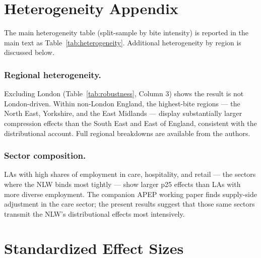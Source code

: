 \documentclass[12pt]{article}
\begin{document}
\section{Heterogeneity Appendix}

The main heterogeneity table (split-sample by bite intensity) is reported in the main text as Table~\ref{tab:heterogeneity}. Additional heterogeneity by region is discussed below.

\subsubsection*{Regional heterogeneity.}
Excluding London (Table~\ref{tab:robustness}, Column 3) shows the result is not London-driven. Within non-London England, the highest-bite regions --- the North East, Yorkshire, and the East Midlands --- display substantially larger compression effects than the South East and East of England, consistent with the distributional account. Full regional breakdowns are available from the authors.

\subsubsection*{Sector composition.}
LAs with high shares of employment in care, hospitality, and retail --- the sectors where the NLW binds most tightly --- show larger p25 effects than LAs with more diverse employment. The companion APEP working paper \citep{apep0515nlw} finds supply-side adjustment in the care sector; the present results suggest that those same sectors transmit the NLW's distributional effects most intensively.

\section{Standardized Effect Sizes}
\label{sec:sde}


\end{document}
